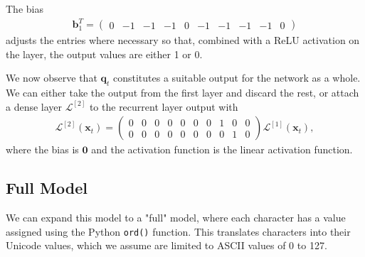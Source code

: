 \documentclass{somasmsc}
\begin{document}
The bias 
\begin{align*}
\pmb{b}_1^T =
\begin{pmatrix}
0 & -1 & -1 & -1 & 0 & -1 & -1 & -1 & -1 & 0
\end{pmatrix}
\end{align*}
adjusts the entries where necessary so that, combined with a ReLU activation on the layer, the output values are either 1 or 0.

We now observe that $\pmb{q}_t$ constitutes a suitable output for the network as a whole. We can either take the output from the first layer and discard the rest, or attach a dense layer $\mathcal{L}^{\left[2\right]}$ to the recurrent layer output with
\begin{align*}
\mathcal{L}^{\left[2\right]}\left(\pmb{x}_t\right) =
\begin{pmatrix}
    0 & 0 & 0 & 0 & 0 & 0 & 0 & 1 & 0 & 0 \\
    0 & 0 & 0 & 0 & 0 & 0 & 0 & 0 & 1 & 0
\end{pmatrix}
\mathcal{L}^{\left[1\right]}\left(\pmb{x}_t\right),
\end{align*}
where the bias is $\mathbf{0}$ and the activation function is the linear activation function.

\subsection{Full Model}\label{zeroone:full}

We can expand this model to a "full" model, where each character has a value assigned using the Python \verb|ord()| function. This translates characters into their Unicode values, which we assume are limited to ASCII values of 0 to 127.
\end{document}
